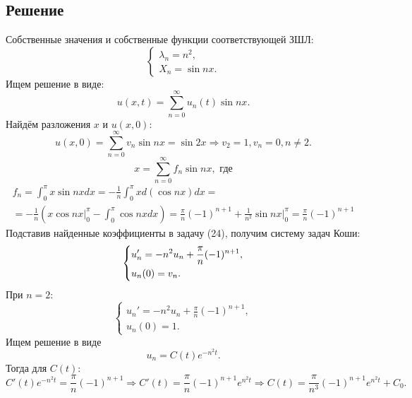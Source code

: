 \documentclass[11pt]{article}
\begin{document}
\subsection{Решение}
\label{sec:org5d12e77}
Собственные значения и собственные функции соответствующей ЗШЛ:
\begin{equation}
\begin{cases}
\lambda_n = n^2, \\
X_n = \sin nx.
\end{cases}
\end{equation}
Ищем решение в виде:
\begin{equation}
u(x, t) = \sum_{n = 0}^{\infty}u_n(t)\sin nx.
\end{equation}
Найдём разложения $x$ и $u(x, 0)$:
\begin{equation*}
u(x, 0) = \sum_{n = 0}^{\infty}v_n\sin nx = \sin 2x \Rightarrow v_2 = 1, v_n = 0, n \neq 2.
\end{equation*}
\begin{equation*}
x = \sum_{n = 0}^{\infty}f_n\sin nx, \text{ где}
\end{equation*}
\begin{multline*}
f_n = \int_0^{\pi}x\sin nxdx = -\frac1n\int_0^{\pi}xd(\cos nx)dx = \\
= -\frac1n\left(x\cos nx\bigg|_0^{\pi} - \int_0^{\pi}\cos nxdx\right) =
\frac{\pi}n(-1)^{n + 1} + \frac1{n^2}\sin nx\bigg|_0^{\pi} = \frac{\pi}n(-1)^{n + 1}
\end{multline*}
Подставив найденные коэффициенты в задачу (24), получим систему задач Коши:
\begin{equation}
\begin{dcases}
u_n' = -n^2u_n + \frac{\pi}n(-1)^{n + 1}, \\
u_n(0) = v_n.
\end{dcases}
\end{equation}
При $n = 2$:
\begin{equation*}
\begin{cases}
u_n' = -n^2u_n + \frac{\pi}n(-1)^{n + 1}, \\
u_n(0) = 1.
\end{cases}
\end{equation*}
Ищем решение в виде
\begin{equation*}
u_n = C(t)e^{-n^2t}.
\end{equation*}
Тогда для $C(t)$:
\begin{equation*}
C'(t)e^{-n^2t} = \frac{\pi}n(-1)^{n + 1} \Rightarrow C'(t) = \frac{\pi}n(-1)^{n + 1}e^{n^2t}
\Rightarrow C(t) = \frac{\pi}{n^3}(-1)^{n + 1}e^{n^2t} + C_0.
\end{equation*}
\end{document}
